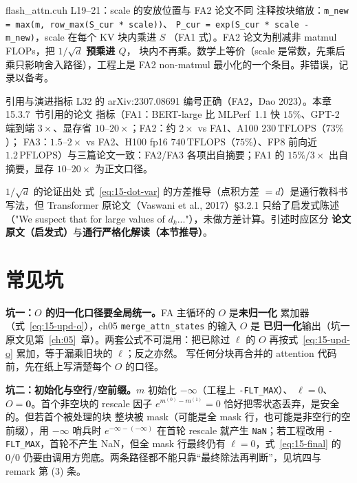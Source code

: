 \begin{kaogu}[F5]{flash\_attn.cuh L19--21：scale 的安放位置与 FA2 论文不同}
  注释按块缩放：\texttt{m\_\allowbreak{}new =\allowbreak{} max\allowbreak{}(m,\allowbreak{} row\_\allowbreak{}max\allowbreak{}(S\_\allowbreak{}cur * scale))}、
  \texttt{P\_cur = exp(S\_cur * scale - m\_new)}，scale 在每个 KV 块内乘进 $S$
  （FA1 式）。FA2 论文为削减非 matmul FLOPs，把 $1/\sqrt{d}$ \textbf{预乘进 $Q$}，
  块内不再乘。数学上等价（scale 是常数，先乘后乘只影响舍入路径），工程上是 FA2
  non-matmul 最小化的一个条目。非错误，记录以备考。
\end{kaogu}

\begin{kaogu}[F5 核校通过]{引用与演进指标}
  L32 的 arXiv:2307.08691 编号正确（FA2，Dao 2023）。本章 15.3.7~节引用的论文
  指标（FA1：BERT-large 比 MLPerf~1.1 快 $15\%$、GPT-2 端到端 $3\times$、显存省
  $10$--$20\times$；FA2：约 $2\times$ vs FA1、A100 $230\,\mathrm{TFLOPS}$（$73\%$）；
  FA3：$1.5$--$2\times$ vs FA2、H100 fp16 $740\,\mathrm{TFLOPS}$（$75\%$）、FP8
  前向近 $1.2\,\mathrm{PFLOPS}$）与三篇论文一致：FA2/FA3 各项出自摘要；FA1 的
  $15\%$/$3\times$ 出自摘要，显存 $10$--$20\times$ 为正文口径。
\end{kaogu}

\begin{kaogu}[F3/F5 考据]{$1/\sqrt{d}$ 的论证出处}
  式~\ref{eq:15-dot-var} 的方差推导（点积方差 $= d$）是通行教科书写法，但
  Transformer 原论文（Vaswani et al., 2017）\S 3.2.1 只给了启发式陈述
  （"We suspect that for large values of $d_k$..."），未做方差计算。引述时应区分
  \textbf{论文原文（启发式）}与\textbf{通行严格化解读（本节推导）}。
\end{kaogu}

\section{常见坑}

\textbf{坑一：$O$ 的归一化口径要全局统一。}\allowbreak{}FA 主循环的 $O$ 是\textbf{未归一化}
累加器（式~\ref{eq:15-upd-o}），ch05 \texttt{merge\_\allowbreak{}attn\_\allowbreak{}states} 的输入 $O$ 是
\textbf{已归一化}输出（坑一原文见第~\ref{ch:05}~章）。两套公式不可混用：把已除过
$\ell$ 的 $O$ 再按式~\ref{eq:15-upd-o} 累加，等于漏乘旧块的 $\ell$；反之亦然。
写任何分块再合并的 attention 代码前，先在纸上写清楚每个 $O$ 的口径。

\textbf{坑二：初始化与空行/空前缀。}$m$ 初始化 $-\infty$（工程上 \texttt{-FLT\_MAX}）、
$\ell = 0$、$O = \mathbf{0}$。首个非空块的 rescale 因子
$e^{m^{(0)} - m^{(1)}} = 0$ 恰好把零状态丢弃，是安全的。但若首个被处理的块
整块被 mask（可能是全 mask 行，也可能是非空行的空前缀），用 $-\infty$ 哨兵时
$e^{-\infty-(-\infty)}$ 在首轮 rescale 就产生 \texttt{NaN}；若工程改用
\texttt{-FLT\_MAX}，首轮不产生 NaN，但全 mask 行最终仍有 $\ell = 0$，式~\ref{eq:15-final}
的 $0/0$ 仍要由调用方兜底。两条路径都不能只靠“最终除法再判断”，见坑四与
remark 第 (3) 条。


